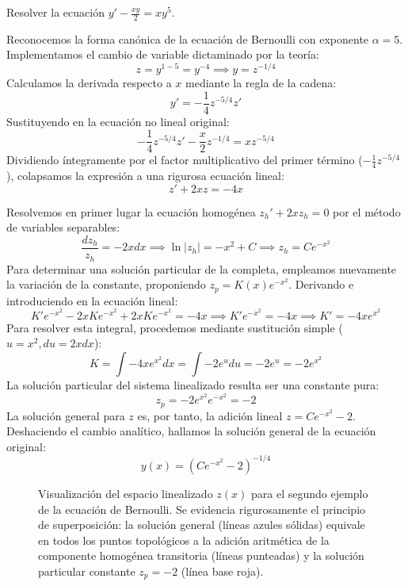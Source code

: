 \begin{ejercicio}
Resolver la ecuación $y' - \frac{xy}{2} = xy^5$.
\end{ejercicio}

\begin{tcolorbox}
Reconocemos la forma canónica de la ecuación de Bernoulli con exponente $\alpha = 5$. Implementamos el cambio de variable dictaminado por la teoría:
$$ z = y^{1-5} = y^{-4} \implies y = z^{-1/4} $$
Calculamos la derivada respecto a $x$ mediante la regla de la cadena:
$$ y' = -\frac{1}{4}z^{-5/4}z' $$
Sustituyendo en la ecuación no lineal original:
$$ -\frac{1}{4}z^{-5/4}z' - \frac{x}{2}z^{-1/4} = xz^{-5/4} $$
Dividiendo íntegramente por el factor multiplicativo del primer término ($-\frac{1}{4}z^{-5/4}$), colapsamos la expresión a una rigurosa ecuación lineal:
$$ z' + 2xz = -4x $$

Resolvemos en primer lugar la ecuación homogénea $z_h' + 2xz_h = 0$ por el método de variables separables:
$$ \frac{dz_h}{z_h} = -2x dx \implies \ln|z_h| = -x^2 + C \implies z_h = C e^{-x^2} $$
Para determinar una solución particular de la completa, empleamos nuevamente la variación de la constante, proponiendo $z_p = K(x)e^{-x^2}$. Derivando e introduciendo en la ecuación lineal:
$$ K'e^{-x^2} - 2xKe^{-x^2} + 2xKe^{-x^2} = -4x \implies K'e^{-x^2} = -4x \implies K' = -4x e^{x^2} $$
Para resolver esta integral, procedemos mediante sustitución simple ($u = x^2, du = 2x dx$):
$$ K = \int -4x e^{x^2} dx = \int -2 e^u du = -2e^u = -2e^{x^2} $$
La solución particular del sistema linealizado resulta ser una constante pura:
$$ z_p = -2e^{x^2}e^{-x^2} = -2 $$
La solución general para $z$ es, por tanto, la adición lineal $z = C e^{-x^2} - 2$.
Deshaciendo el cambio analítico, hallamos la solución general de la ecuación original:
$$ y(x) = (C e^{-x^2} - 2)^{-1/4} $$

\begin{figure}[H]
    \centering
    
    \caption{Visualización del espacio linealizado $z(x)$ para el segundo ejemplo de la ecuación de Bernoulli. Se evidencia rigurosamente el principio de superposición: la solución general (líneas azules sólidas) equivale en todos los puntos topológicos a la adición aritmética de la componente homogénea transitoria (líneas punteadas) y la solución particular constante $z_p = -2$ (línea base roja).}
\end{figure}
\end{tcolorbox}

